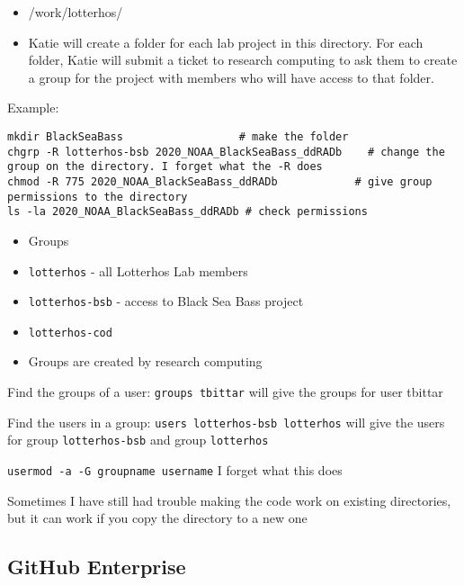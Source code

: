 \documentclass[
  letterpaper,
  DIV=11,
  numbers=noendperiod]{scrreprt}
\begin{document}
\begin{itemize}
\item
  /work/lotterhos/
\item
  Katie will create a folder for each lab project in this directory. For
  each folder, Katie will submit a ticket to research computing to ask
  them to create a group for the project with members who will have
  access to that folder.
\end{itemize}

Example:

\begin{verbatim}
mkdir BlackSeaBass                  # make the folder
chgrp -R lotterhos-bsb 2020_NOAA_BlackSeaBass_ddRADb    # change the group on the directory. I forget what the -R does
chmod -R 775 2020_NOAA_BlackSeaBass_ddRADb            # give group permissions to the directory
ls -la 2020_NOAA_BlackSeaBass_ddRADb # check permissions
\end{verbatim}

\begin{itemize}
\item
  Groups
\item
  \texttt{lotterhos} - all Lotterhos Lab members
\item
  \texttt{lotterhos-bsb} - access to Black Sea Bass project
\item
  \texttt{lotterhos-cod}
\item
  Groups are created by research computing
\end{itemize}

Find the groups of a user: \texttt{groups\ tbittar} will give the groups
for user tbittar

Find the users in a group: \texttt{users\ lotterhos-bsb\ lotterhos} will
give the users for group \texttt{lotterhos-bsb} and group
\texttt{lotterhos}

\texttt{usermod\ -a\ -G\ groupname\ username} I forget what this does

Sometimes I have still had trouble making the code work on existing
directories, but it can work if you copy the directory to a new one

\hypertarget{github-enterprise}{%
\subsection*{\texorpdfstring{\textbf{GitHub
Enterprise}}{GitHub Enterprise}}\label{github-enterprise}}
\end{document}
